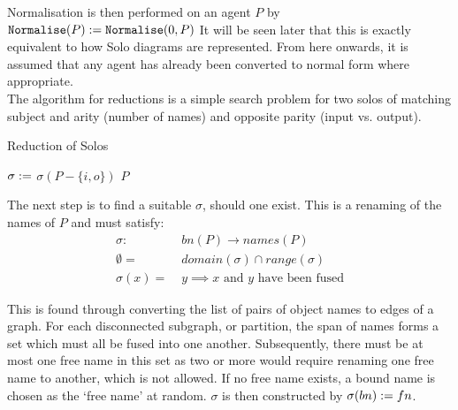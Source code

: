         Normalisation is then performed on an agent $P$ by $\texttt{Normalise}(P) := \texttt{Normalise}(0, P)$
        It will be seen later that this is exactly equivalent to how Solo diagrams are represented.
        From here onwards, it is assumed that any agent has already been converted to normal form where appropriate.\\

        The algorithm for reductions is a simple search problem for two solos of matching subject and arity (number of names) and opposite parity (input vs. output).
        \begin{breakablealgorithm}
            \caption{Reduction of Solos}
            \begin{algorithmic}[1]
                                \State$\sigma :=$ 
                                    \State\Return$\sigma(P - \{i, o\})$
                                \EndIf
                            \EndIf
                        \EndFor
                    \EndFor
                    \State\Return$P$
                \EndFunction
            \end{algorithmic}
        \end{breakablealgorithm}

        The next step is to find a suitable $\sigma$, should one exist. This is a renaming of the names of $P$ and must satisfy:
        \begin{align*}
            \sigma : \; & bn(P) \rightarrow names(P) \\
            \emptyset = \; & domain(\sigma) \cap range(\sigma) \\
            \sigma(x) = \; & y \implies \text{$x$ and $y$ have been fused}
        \end{align*}

        This is found through converting the list of pairs of object names to edges of a graph.
        For each disconnected subgraph, or partition, the span of names forms a set which must all be fused into one another.
        Subsequently, there must be at most one free name in this set as two or more would require renaming one free name to another, which is not allowed.
        If no free name exists, a bound name is chosen as the `free name' at random.
        $\sigma$ is then constructed by $\sigma(bn) := fn$.

